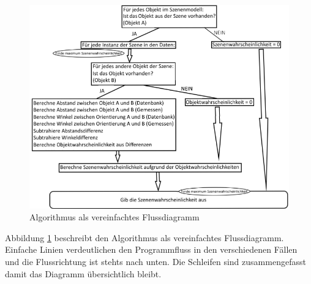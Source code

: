 \begin{figure}
	\centering
	\includegraphics[width=16cm]{bilder/AlgorithmusRoh.pdf}
	\caption{Algorithmus als vereinfachtes Flussdiagramm}
	\label{img:janein}
\end{figure}
Abbildung \ref{img:janein} beschreibt den Algorithmus als vereinfachtes Flussdiagramm. Einfache Linien verdeutlichen den Programmfluss in den verschiedenen Fällen und die Flussrichtung ist stehts nach unten. Die Schleifen sind zusammengefasst damit das Diagramm übersichtlich bleibt.

